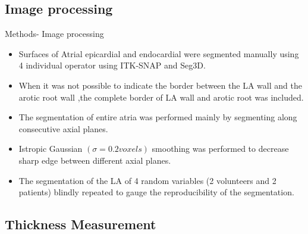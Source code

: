 \documentclass[aspectratio=43]{beamer}
\begin{document}
 \newpage
 \subsection{Image processing}
 \begin{frame}{Methods- Image processing}
 \begin{itemize}
 \item Surfaces of Atrial epicardial and endocardial were segmented manually using 4 individual operator using ITK-SNAP and Seg3D.
 \item When it was not possible to indicate the border between the LA wall and the arotic root wall ,the complete border of LA wall and arotic root was included.
 \item The segmentation of entire atria was performed mainly by segmenting along consecutive axial planes.
 \item Istropic Gaussian \begin{math}( \sigma = 0.2 voxels)\end{math} smoothing was performed to decrease sharp edge between different axial planes.
 \item The segmentation of the LA of 4 random variables (2 volunteers and 2 patients) blindly repeated to gauge the  reproducibility of the segmentation.
   
 \end{itemize}
 
 \end{frame}
 
 \newpage
\subsection{Thickness Measurement} 
 
\end{document}
